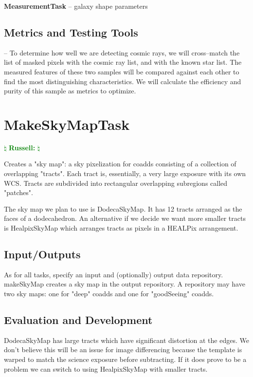 \documentclass[12pt]{article}
\newcommand{\russ} { \textcolor{green} {
\ensuremath{\natural} {\bf Russell:}  
\ensuremath{\natural} } }
\begin{document}
{\bf MeasurementTask}
-- galaxy shape parameters

\subsection{Metrics and Testing Tools}

-- To determine how well we are detecting cosmic rays, we will
cross--match the list of masked pixels with the cosmic ray list, and
with the known star list.  The measured features of these two samples
will be compared against each other to find the most distinguishing
characteristics.  We will calculate the efficiency and purity of this
sample as metrics to optimize.


\clearpage 
\section{MakeSkyMapTask} \russ

Creates a "sky map": a sky pixelization for coadds consisting of a collection of overlapping "tracts".
Each tract is, essentially, a very large exposure with its own WCS.
Tracts are subdivided into rectangular overlapping subregions called "patches".

The sky map we plan to use is DodecaSkyMap. It has 12 tracts arranged as the faces of a dodecahedron.
An alternative if we decide we want more smaller tracts is HealpixSkyMap which arranges
tracts as pixels in a HEALPix arrangement.

\subsection{Input/Outputs}

As for all tasks, specify an input and (optionally) output data repository.
makeSkyMap creates a sky map in the output repository.
A repository may have two sky maps: one for "deep" coadds and one for "goodSeeing" coadds.

\subsection{Evaluation and Development}

DodecaSkyMap has large tracts which have significant distortion at the edges.
We don't believe this will be an issue for image differencing because the template is warped
to match the science exposure before subtracting. If it does prove to be a problem
we can switch to using HealpixSkyMap with smaller tracts.
\end{document}
